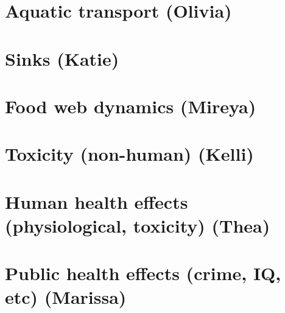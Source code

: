 \documentclass{article}\usepackage[]{graphicx}\usepackage[]{color}
\begin{document}
\section{Aquatic transport (Olivia)}

\section{Sinks (Katie)}\section{Food web dynamics (Mireya)}

\section{Toxicity (non-human) (Kelli)}

\section{Human health effects (physiological, toxicity) (Thea)}

\section{Public health effects (crime, IQ, etc) (Marissa)}
\end{document}
